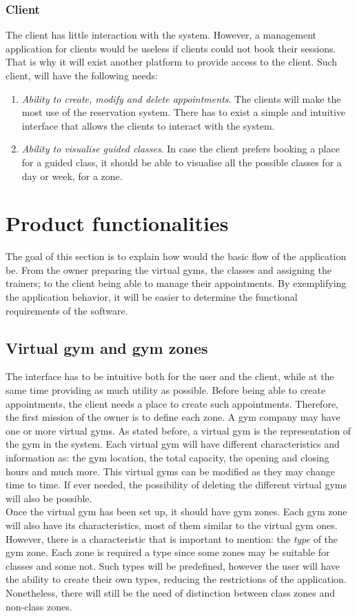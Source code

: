 \documentclass[a4paper, 12pt, oneside]{book}
\begin{document}
\subsubsection{Client}
The client has little interaction with the system. However, a management application for clients would be useless if clients could not book their sessions. That is why it will exist another platform to provide access to the client. Such client, will have the following needs:
\begin{enumerate}[label = -]
	\item \emph{Ability to create, modify and delete appointments}. The clients will make the most use of the reservation system. There has to exist a simple and intuitive interface that allows the clients to interact with the system.
	\item \emph{Ability to visualise guided classes}. In case the client prefers booking a place for a guided class, it should be able to visualise all the possible classes for a day or week, for a zone.
\end{enumerate}
\section{Product functionalities}
The goal of this section is to explain how would the basic flow of the application be. From the owner preparing the virtual gyms, the classes and assigning the trainers; to the client being able to manage their appointments. By exemplifying the application behavior, it will be easier to determine the functional requirements of the software.
\subsection{Virtual gym and gym zones}
The interface has to be intuitive both for the user and the client, while at the same time providing as much utility as possible. Before being able to create appointments, the client needs a place to create such appointments. Therefore, the first mission of the owner is to define each zone. A gym company may have one or more virtual gyms. As stated before, a virtual gym is the representation of the gym in the system. Each virtual gym will have different characteristics and information as: the gym location, the total capacity, the opening and closing hours and much more. This virtual gyms can be modified as they may change time to time. If ever needed, the possibility of deleting the different virtual gyms will also be possible.
\\[8pt]
Once the virtual gym has been set up, it should have gym zones. Each gym zone will also have its characteristics, most of them similar to the virtual gym ones. However, there is a characteristic that is important to mention: the \emph{type} of the gym zone. Each zone is required a type since some zones may be suitable for classes and some not. Such types will be predefined, however the user will have the ability to create their own types, reducing the restrictions of the application. Nonetheless, there will still be the need of distinction between class zones and non-class zones.
\end{document}
